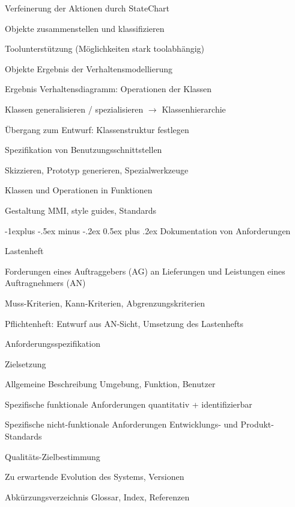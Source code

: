 \documentclass[a4paper]{article}
\makeatletter
\renewcommand{\subsection}{\@startsection{subsection}{2}{0mm}%
                                {-1explus -.5ex minus -.2ex}%
                                {0.5ex plus .2ex}%
                                {\normalfont\normalsize\bfseries}}
\makeatother
\begin{document}
\begin{multicols}{3}
\begin{itemize*}
    \item Verfeinerung der Aktionen durch StateChart
    \item Objekte zusammenstellen und klassifizieren
    \begin{itemize*}
      \item Toolunterstützung (Möglichkeiten stark toolabhängig)
      \item Objekte Ergebnis der Verhaltensmodellierung
      \item Ergebnis Verhaltensdiagramm: Operationen der Klassen
      \item Klassen generalisieren / spezialisieren $\rightarrow$ Klassenhierarchie
    \end{itemize*}
    \item Übergang zum Entwurf: Klassenstruktur festlegen
    \item Spezifikation von Benutzungsschnittstellen
    \begin{itemize*}
      \item Skizzieren, Prototyp generieren, Spezialwerkzeuge
      \item Klassen und Operationen in Funktionen
      \item Gestaltung MMI, style guides, Standards
    \end{itemize*}
  \end{itemize*}

  \subsection{Dokumentation von Anforderungen}
  \begin{itemize*}
    \item Lastenheft
    \begin{itemize*}
      \item Forderungen eines Auftraggebers (AG) an Lieferungen und Leistungen eines Auftragnehmers (AN)
      \item Muss-Kriterien, Kann-Kriterien, Abgrenzungskriterien
    \end{itemize*}
    \item Pflichtenheft: Entwurf aus AN-Sicht, Umsetzung des Lastenhefts
    \item Anforderungsspezifikation
    \begin{description*}
      \item[Zielsetzung]
      \item[Allgemeine Beschreibung] Umgebung, Funktion, Benutzer
      \item[Spezifische funktionale Anforderungen] quantitativ + identifizierbar
      \item[Spezifische nicht-funktionale Anforderungen] Entwicklungs- und Produkt-Standards
      \item[Qualitäts-Zielbestimmung]
      \item[Zu erwartende Evolution] des Systems, Versionen
      \item[Abkürzungsverzeichnis] Glossar, Index, Referenzen
    \end{description*}
  \end{itemize*}



\end{multicols}
\end{document}
